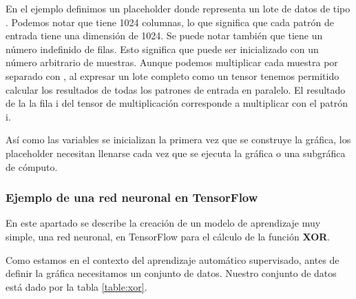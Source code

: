 \begin{sphinxVerbatim}[commandchars=\\\{\}]
    \PYG{p}{[} \PYG{p}{]}
  \PYG{p}{[}\PYG{p}{]}   
   
\end{sphinxVerbatim}

En el ejemplo definimos un placeholder donde 
representa un lote de datos de tipo .
Podemos notar que  tiene 1024 columnas, lo
que significa que cada patrón de entrada
tiene una dimensión de 1024. Se puede notar también
que  tiene un número indefinido de filas.
Esto significa que  puede ser inicializado
con un número arbitrario de muestras. Aunque podemos
multiplicar cada muestra por separado con ,
al expresar un lote completo como un tensor tenemos
permitido calcular los resultados de todas los
patrones de entrada en paralelo. El
resultado de la la fila i del tensor de
multiplicación corresponde a multiplicar 
con el patrón i.

Así como las variables se inicializan la primera vez
que se construye la gráfica, los placeholder necesitan
llenarse cada vez que se ejecuta la gráfica o una
subgráfica de cómputo.


\subsubsection{Ejemplo de una red neuronal en TensorFlow}

En este apartado se describe la creación de un modelo de aprendizaje muy
simple, una red neuronal, en TensorFlow para el cálculo de la función
\textbf{XOR}.


Como estamos en el contexto del aprendizaje automático
supervisado, antes de definir la gráfica necesitamos un conjunto de datos.
Nuestro conjunto de datos está dado por la tabla \ref{table:xor}.


